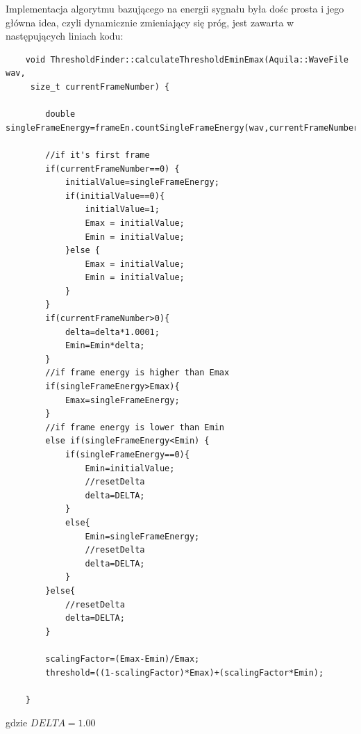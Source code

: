 \documentclass[eng,printmode]{mgr}
\begin{document}
Implementacja algorytmu bazującego na energii sygnału była dośc prosta i jego główna idea, czyli dynamicznie zmieniający się próg, jest zawarta w następujących liniach kodu:
\lstset{language=C++,basicstyle=\scriptsize}
\begin{lstlisting}
	void ThresholdFinder::calculateThresholdEminEmax(Aquila::WaveFile wav,
	 size_t currentFrameNumber) {
		
		double singleFrameEnergy=frameEn.countSingleFrameEnergy(wav,currentFrameNumber);
		
		//if it's first frame
		if(currentFrameNumber==0) {
			initialValue=singleFrameEnergy;
			if(initialValue==0){
				initialValue=1;
				Emax = initialValue;
				Emin = initialValue;
			}else {
				Emax = initialValue;
				Emin = initialValue;
			}
		}	
		if(currentFrameNumber>0){
			delta=delta*1.0001;
			Emin=Emin*delta;
		}
		//if frame energy is higher than Emax
		if(singleFrameEnergy>Emax){
			Emax=singleFrameEnergy;
		}
		//if frame energy is lower than Emin
		else if(singleFrameEnergy<Emin) {
			if(singleFrameEnergy==0){
				Emin=initialValue;
				//resetDelta
				delta=DELTA;
			}
			else{
				Emin=singleFrameEnergy;
				//resetDelta
				delta=DELTA;
			}
		}else{
			//resetDelta
			delta=DELTA;
		}
		
		scalingFactor=(Emax-Emin)/Emax;
		threshold=((1-scalingFactor)*Emax)+(scalingFactor*Emin);
		
	}
\end{lstlisting}\vspace{5mm}
gdzie $DELTA=1.00$
\end{document}
